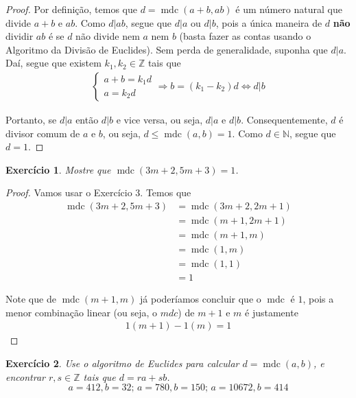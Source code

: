 \documentclass[a4paper,12pt]{article}
\DeclareMathOperator{\mdc}{mdc}
\newtheorem{exercise}{Exercício}%
\begin{document}
	\begin{proof}
		Por definição, temos que $d = \mdc(a+b, ab)$ é um número natural que divide $a+b$ e $ab$. Como $d|ab$, segue que $d|a$ ou $d|b$, pois a única maneira de $d$ \textbf{não} dividir $ab$ é se $d$ não divide nem $a$ nem $b$ (basta fazer as contas usando o Algoritmo da Divisão de Euclides). Sem perda de generalidade, suponha que $d|a$. Daí, segue que existem $k_1, k_2\in\mathbb{Z}$ tais que
		\begin{align*}
		\begin{cases}
		a + b = k_1d \\
		a = k_2d 
		\end{cases} \Rightarrow b = (k_1 - k_2)d \Leftrightarrow d|b
		\end{align*}
		\par Portanto, se $d|a$ então $d|b$ e vice versa, ou seja, $d|a$ e $d|b$. Consequentemente, $d$ é divisor comum de $a$ e $b$, ou seja, $d\leq \mdc(a,b) = 1$. Como $d\in\mathbb{N}$, segue que $d=1$.
	\end{proof}
	\begin{exercise}
		Mostre que $\mdc(3m + 2, 5m+3) = 1$.
	\end{exercise}
	\begin{proof}
		Vamos usar o Exercício 3. Temos que
		\begin{align*}
			\mdc(3m+2, 5m+3) &= \mdc( 3m+2, 2m+1 ) \\
			&= \mdc(m + 1, 2m+1) \\
			&= \mdc(m+1, m) \\
			&= \mdc(1, m) \\
			&= \mdc(1,1) \\
			&= 1
		\end{align*}
		\par Note que de $\mdc(m+1, m)$ já poderíamos concluir que o $\mdc$ é $1$, pois a menor combinação linear (ou seja, o $mdc$) de $m+1$ e $m$ é justamente 
		\begin{align*}
		1(m+1) -1(m) = 1
		\end{align*}
	\end{proof}
	\begin{exercise}
		Use o algoritmo de Euclides para calcular $d = \mdc(a,b)$, e encontrar $r,s\in\mathbb{Z}$ tais que $d = ra + sb$.
		\begin{equation*}
		a=412, b=32 \text{; } a=780, b=150 \text{; } a=10672, b=414
		\end{equation*}
	\end{exercise}
\end{document}
